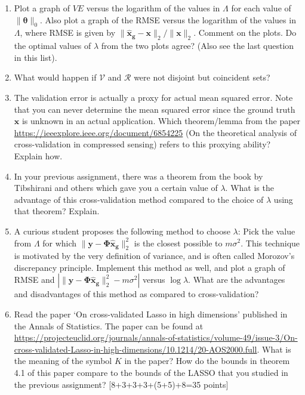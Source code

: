 \documentclass[11pt]{article}
\begin{document}
\begin{enumerate}
\begin{enumerate}
\item Plot a graph of $VE$ versus the logarithm of the values in $\Lambda$ for each value of $\|\boldsymbol{\theta}\|_0$.  Also plot a graph of the RMSE versus the logarithm of the values in $\Lambda$, where RMSE is given by $\|\boldsymbol{\hat{x}_g} - \boldsymbol{x}\|_2 / \|\boldsymbol{x}\|_2$. Comment on the plots. Do the optimal values of $\lambda$ from the two plots agree? (Also see the last question in this list).
\item What would happen if $\mathcal{V}$ and $\mathcal{R}$ were not disjoint but coincident sets? 
\item The validation error is actually a proxy for actual mean squared error. Note that you can never determine the mean squared error since the ground truth $\boldsymbol{x}$ is unknown in an actual application. Which theorem/lemma from the paper \url{https://ieeexplore.ieee.org/document/6854225} (On the theoretical analysis of cross-validation in compressed sensing) refers to this proxying ability? Explain how.  
\item In your previous assignment, there was a theorem from the book by Tibshirani and others which gave you a certain value of $\lambda$. What is the advantage of this cross-validation method compared to the choice of $\lambda$ using that theorem? Explain.
\item A curious student proposes the following method to choose $\lambda$: Pick the value from $\Lambda$ for which $\|\boldsymbol{y}-\boldsymbol{\Phi \hat{x}_g}\|^2_2$ is the closest possible to $m \sigma^2$. This technique is motivated by the very definition of variance, and is often called Morozov's discrepancy principle. Implement this method as well, and plot a graph of RMSE and $|\|\boldsymbol{y}-\boldsymbol{\Phi \hat{x}_g}\|^2_2-m\sigma^2|$ versus $\log \lambda$. What are the advantages and disadvantages of this method as compared to cross-validation?
\item Read the paper `On cross-validated Lasso in high dimensions' published in the Annals of Statistics. The paper can be found at \url{https://projecteuclid.org/journals/annals-of-statistics/volume-49/issue-3/On-cross-validated-Lasso-in-high-dimensions/10.1214/20-AOS2000.full}. What is the meaning of the symbol $K$ in the paper? How do the bounds in theorem 4.1 of this paper compare to the bounds of the LASSO that you studied in the previous assignment?  
\textsf{[8+3+3+3+(5+5)+8=35 points]}
\end{enumerate}


\end{enumerate}
\end{document}
